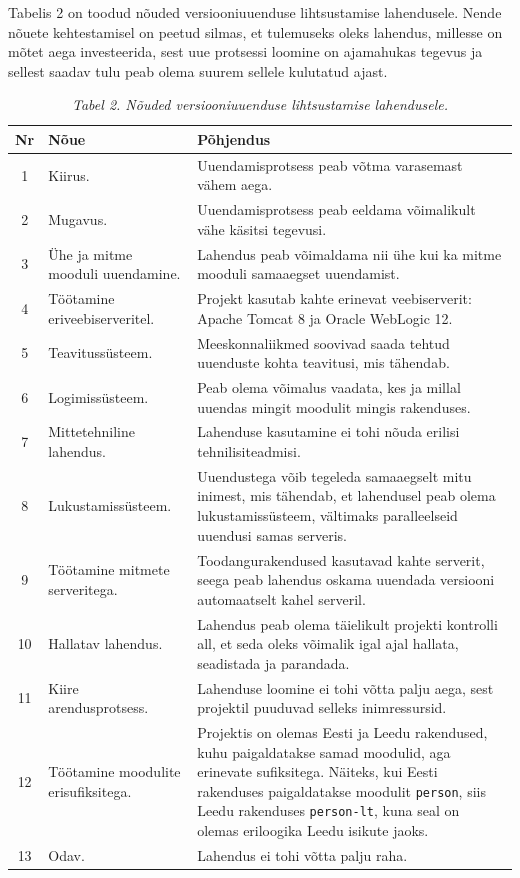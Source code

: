 \documentclass[12pt]{article}
\newcommand{\code}[1]{\texttt{#1}}
\begin{document}
  Tabelis 2 on toodud nõuded versiooniuuenduse lihtsustamise lahendusele. Nende nõuete kehtestamisel on peetud silmas, et tulemuseks oleks lahendus, millesse on mõtet aega investeerida, sest uue protsessi loomine on ajamahukas tegevus ja sellest saadav tulu peab olema suurem sellele kulutatud ajast.
  
  \begin{table}[H]
    \caption*{\textit{Tabel 2. Nõuded versiooniuuenduse lihtsustamise lahendusele.}}
    
    \begin{tabular}{|c|p{3.5cm}|p{9cm}|}
      \hline
      \textbf{Nr} & \textbf{Nõue} & \textbf{Põhjendus}\\
      \hline
      1 & Kiirus. & Uuendamisprotsess peab võtma varasemast vähem aega.\\
      \hline
      2 & Mugavus. & Uuendamisprotsess peab eeldama võimalikult vähe käsitsi tegevusi.\\
      \hline
      3 & Ühe ja mitme mooduli uuendamine. & Lahendus peab võimaldama nii ühe kui ka mitme mooduli samaaegset uuendamist.\\
      \hline
      4 & Töötamine eriveebiserveritel. & Projekt kasutab kahte erinevat veebiserverit: Apache Tomcat 8 ja Oracle WebLogic 12.\\
      \hline
      5 & Teavitussüsteem. & Meeskonnaliikmed soovivad saada tehtud uuenduste kohta teavitusi, mis tähendab.\\
      \hline
      6 & Logimissüsteem. & Peab olema võimalus vaadata, kes ja millal uuendas mingit moodulit mingis rakenduses.\\
      \hline
      7 & Mittetehniline lahendus. & Lahenduse kasutamine ei tohi nõuda erilisi tehnilisiteadmisi.\\
      \hline
      8 & Lukustamissüsteem. & Uuendustega võib tegeleda samaaegselt mitu inimest, mis tähendab, et lahendusel peab olema lukustamissüsteem, vältimaks paralleelseid uuendusi samas serveris.\\
      \hline
      9 & Töötamine mitmete serveritega. & Toodangurakendused kasutavad kahte serverit, seega peab lahendus oskama uuendada versiooni automaatselt kahel serveril.\\
      \hline
      10 & Hallatav lahendus. & Lahendus peab olema täielikult projekti kontrolli all, et seda oleks võimalik igal ajal hallata, seadistada ja parandada.\\
      \hline
      11 & Kiire arendusprotsess. & Lahenduse loomine ei tohi võtta palju aega, sest projektil puuduvad selleks inimressursid.\\
      \hline
      12 & Töötamine moodulite erisufiksitega. & Projektis on olemas Eesti ja Leedu rakendused, kuhu paigaldatakse samad moodulid, aga erinevate sufiksitega. Näiteks, kui Eesti rakenduses paigaldatakse moodulit \code{person}, siis Leedu rakenduses \code{person-lt}, kuna seal on olemas eriloogika Leedu isikute jaoks.\\
      \hline
      13 & Odav. & Lahendus ei tohi võtta palju raha.\\
      \hline
    \end{tabular}
  \end{table}
  
\end{document}

